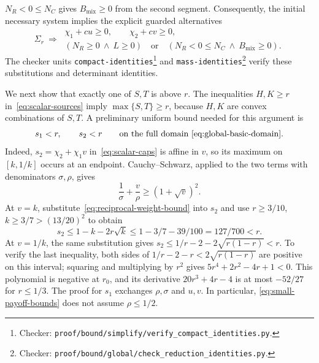 \documentclass[11pt]{article}
\theoremstyle{remark}
\theoremstyle{plain}
\begin{document}
$N_R<0\le N_C$ gives $B_{\mathrm{mix}}\ge0$ from the second segment.
Consequently, the initial necessary system implies the explicit
guarded alternatives
\begin{equation}
 \Sigma_r\ \Longrightarrow\
 \begin{gathered}
 \chi_1+cu\ge0,\qquad\chi_2+cv\ge0,\\
 (N_R\ge0\ \land\ L\ge0)
 \quad\text{or}\quad
 (N_R<0\le N_C\ \land\ B_{\mathrm{mix}}\ge0).
 \end{gathered}
 \label{eq:mixing-branch-guards}
\end{equation}
The checker units \nolinkurl{compact-identities}\footnote{Checker:
\nolinkurl{proof/bound/simplify/verify_compact_identities.py}.\label{fn:checker-compact-identities}} and
\nolinkurl{mass-identities}\footnote{Checker:
\nolinkurl{proof/bound/global/check_reduction_identities.py}.\label{fn:checker-mass-identities}}
verify these substitutions and determinant identities.

We next show that exactly one of $S,T$ is above $r$. The inequalities
$H,K\ge r$ in~\eqref{eq:scalar-sources} imply $\max\{S,T\}\ge r$,
because $H,K$ are convex combinations of $S,T$. A preliminary
uniform bound needed for this argument is
\begin{equation}
 s_1<r,\qquad s_2<r
 \qquad\text{on the full domain~\eqref{eq:global-basic-domain}}.
 \label{eq:small-payoff-bounds}
\end{equation}
Indeed, $s_2=\chi_2+\chi_1v$ in~\eqref{eq:scalar-caps} is affine
in $v$, so its maximum on $[k,1/k]$ occurs at an endpoint.
Cauchy--Schwarz, applied to the two terms with denominators
$\sigma,\rho$, gives
\begin{equation}
 \frac1\sigma+\frac v\rho\ge(1+\sqrt v)^2.
 \label{eq:reciprocal-weight-bound}
\end{equation}
At $v=k$, substitute~\eqref{eq:reciprocal-weight-bound} into $s_2$
and use $r\ge3/10$, $k\ge3/7>(13/20)^2$ to obtain
\[
 s_2\le1-k-2r\sqrt{k}
       \le1-3/7-39/100=127/700<r.
\]
At $v=1/k$, the same substitution gives
$s_2\le1/r-2-2\sqrt{r(1-r)}<r$. To verify the last inequality,
both sides of $1/r-2-r<2\sqrt{r(1-r)}$ are positive on this interval;
squaring and multiplying by $r^2$ gives
$5r^4+2r^2-4r+1<0$. This polynomial is negative at $r_0$, and its
derivative $20r^3+4r-4$ is at most $-52/27$ for $r\le1/3$.
The proof for $s_1$ exchanges $\rho,\sigma$ and $u,v$. In particular,
\eqref{eq:small-payoff-bounds} does not assume $\rho\le1/2$.
\end{document}
